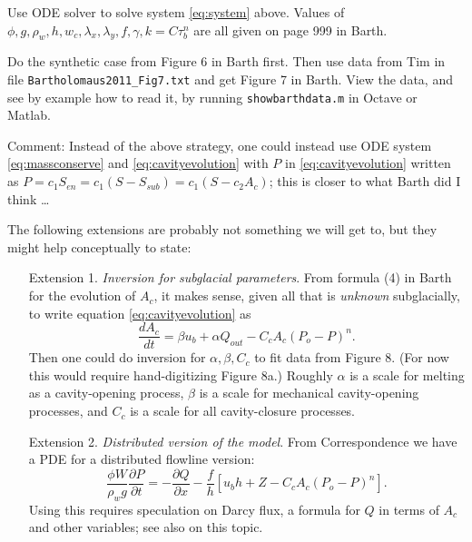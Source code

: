 \documentclass[11pt,final]{amsart}%
\begin{document}
Use ODE solver to solve system \eqref{eq:system} above.  Values of $\phi,g,\rho_w,h,w_c,\lambda_x,\lambda_y,f,\gamma,k=C\tau_b^n$ are all given on page 999 in Barth.

Do the synthetic case from Figure 6 in Barth first.  Then use data from Tim in file \texttt{Bartholomaus2011_Fig7.txt} and get Figure 7 in Barth.  View the data, and see by example how to read it, by running \texttt{showbarthdata.m} in Octave or Matlab.

Comment:  Instead of the above strategy, one could instead use ODE system \eqref{eq:massconserve} and \eqref{eq:cavityevolution} with $P$ in \eqref{eq:cavityevolution} written as $P= c_1 S_{en} = c_1 (S - S_{sub}) = c_1 (S - c_2 A_c)$; this is closer to what Barth did I think \dots

The following extensions are probably not something we will get to, but they might help conceptually to state:\begin{itemize}

\item[Extension 1.\quad] \emph{Inversion for subglacial parameters}.  From formula (4) in Barth for the evolution of $A_c$, it makes sense, given all that is \emph{unknown} subglacially, to write equation \eqref{eq:cavityevolution} as
\begin{equation}
\frac{dA_c}{dt} = \beta u_b + \alpha Q_{out} - C_c A_c (P_o-P)^n. \label{eq:cavityevolutionforinversion}
\end{equation}
Then one could do inversion for $\alpha,\beta,C_c$ to fit data from Figure 8.  (For now this would require hand-digitizing Figure 8a.)  Roughly $\alpha$ is a scale for melting as a cavity-opening process, $\beta$ is a scale for mechanical cavity-opening processes, and $C_c$ is a scale for all cavity-closure processes.

\item[Extension 2.\quad] \emph{Distributed version of the model}.  From Correspondence \citep{Bueler2014correspondence} we have a PDE for a distributed flowline version:
\begin{equation}
\frac{\phi W}{\rho_w g} \frac{\partial P}{\partial t} = - \frac{\partial Q}{\partial x} - \frac{f}{h} \left[u_b h + Z - C_c A_c (P_o-P)^n\right]. \label{eq:barth:distpressure}
\end{equation}
Using this requires speculation on Darcy flux, a formula for $Q$ in terms of $A_c$ and other variables; see also \cite{BuelervanPeltDRAFT} on this topic.

\end{itemize}
\end{document}
